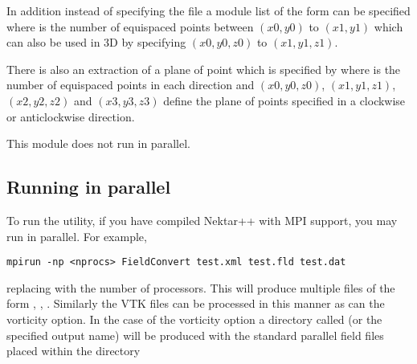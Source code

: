 In addition instead of specifying the file  a module list of
the form 
can be specified where  is the number of equispaced points between
$(x0,y0)$ to $(x1,y1)$ which can also be used in 3D by specifying $(x0,y0,z0)$
to $(x1,y1,z1)$.

There is also an extraction of a plane of point which is specified by
where  is the number of equispaced points in each direction 
and $(x0,y0,z0)$, $(x1,y1,z1)$, $(x2,y2,z2)$ and $(x3,y3,z3)$ define the plane
of points specified in a clockwise or anticlockwise direction.

\begin{notebox}
This module does not run in parallel.
\end{notebox}


\subsection{Running in parallel}
To run the utility, if you have compiled Nektar++ with MPI support, you may run
in parallel. For example,
\begin{lstlisting}[style=BashInputStyle]
mpirun -np <nprocs> FieldConvert test.xml test.fld test.dat
\end{lstlisting}
replacing  with the number of processors. This will produce 
multiple  files of the form , 
, . Similarly the VTK files can be
processed in this manner as can the vorticity option. In the case of the 
vorticity option a directory called  (or the specified 
output name) will be produced with the standard parallel field files placed 
within the directory


